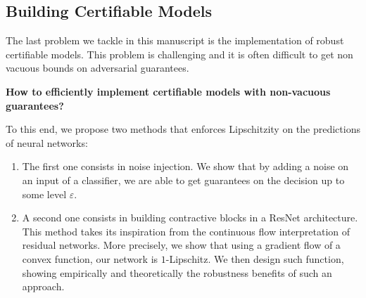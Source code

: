 \subsection{Building Certifiable Models}

The last problem we tackle in this manuscript is the implementation of robust certifiable models. This problem is challenging and it is often difficult to get non vacuous bounds on adversarial guarantees.
\medskip
\begin{tcolorbox}[title=Question 3]
\textbf{How to efficiently implement certifiable models with non-vacuous guarantees?}
\end{tcolorbox}
\medskip
To this end, we propose two methods that enforces Lipschitzity on the predictions of neural networks:
\begin{enumerate}
    \item The first one consists in noise injection. We show that by adding a noise on an input of a classifier, we are able to get guarantees on the decision up to some level $\varepsilon$.
    \item A second one consists in building contractive blocks in a ResNet architecture. This method takes its inspiration from the continuous flow interpretation of residual networks. More precisely, we show that using a gradient flow of a convex function, our network is $1$-Lipschitz. We then design such function, showing empirically and theoretically the robustness benefits of such an approach.
\end{enumerate}




